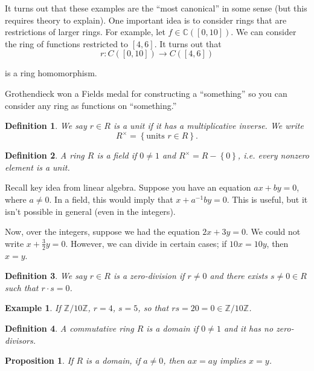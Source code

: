\documentclass[12pt]{article}
\newtheorem*{definition}{Definition}
\newtheorem*{example}{Example}
\newtheorem*{prop}{Proposition}
\def\CC{\mathbb{C}}
\def\ZZ{\mathbb{Z}}
\begin{document}
It turns out that these examples are the ``most canonical'' in some sense (but this requires theory to explain).  One important idea is to consider rings that are restrictions of larger rings.  For example, let $f \in \CC([0, 10])$.  We can consider the ring of functions restricted to $[4, 6]$.  It turns out that
\[
  r: C([0, 10]) \to C([4, 6])
  \]

  is a ring homomorphism.

  Grothendieck won a Fields medal for constructing a ``something'' so you can consider any ring as functions on ``something.'' \\

  \begin{definition}
    We say $r \in R$ is a unit if it has a multiplicative inverse.  We write
    \[
      R^{\times} = \left\{ \text{units } r \in R \right\}.
    \]
  \end{definition}

  \begin{definition}
    A ring $R$ is a field if $0 \neq 1$ and $R^{\times} = R - \left\{ 0 \right\}$, i.e. every nonzero element is a unit.
  \end{definition}

  Recall key idea from linear algebra.  Suppose you have an equation $ax+by = 0$, where $a \neq 0$.  In a field, this would imply that $x + a^{-1}b y = 0.$  This is useful, but it isn't possible in general (even in the integers).

  Now, over the integers, suppose we had the equation $2x + 3y = 0$.  We could not write $x + \frac{3}{2} y = 0$.  However, we can divide in certain cases; if $10x = 10y$, then $x = y$.

  \begin{definition}
    We say $r \in R$ is a zero-division if $r \neq 0$ and there exists $s \neq 0 \in R$ such that $r \cdot s = 0$.
 \end{definition}

 \begin{example}
   If $\ZZ / 10 \ZZ$, $r = 4$, $s = 5$, so that $rs = 20 = 0 \in \ZZ / 10 \ZZ$. \\
 \end{example}

 \begin{definition}
   A commutative ring $R$ is a domain if $0 \neq 1$ and it has no zero-divisors. \\
 \end{definition}

 \begin{prop}
   If $R$ is a domain, if $a \neq 0$, then $ax = ay$ implies $x = y$.
 \end{prop}
\end{document}
